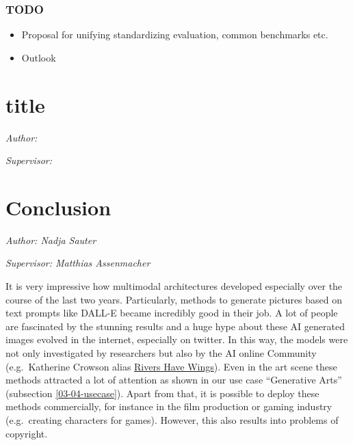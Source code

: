 \documentclass[
]{krantz}
\providecommand{\tightlist}{%
  \setlength{\itemsep}{0pt}\setlength{\parskip}{0pt}}
\begin{document}
\hypertarget{todo-4}{%
\subsection{TODO}\label{todo-4}}

\begin{itemize}
\tightlist
\item
  Proposal for unifying standardizing evaluation, common benchmarks etc.
\item
  Outlook
\end{itemize}

\hypertarget{title}{%
\chapter{title}\label{title}}

\emph{Author: }

\emph{Supervisor: }

\hypertarget{conclusion}{%
\chapter{Conclusion}\label{conclusion}}

\emph{Author: Nadja Sauter}

\emph{Supervisor: Matthias Assenmacher}

It is very impressive how multimodal architectures developed especially over the course of the last two years. Particularly, methods to generate pictures based on text prompts like DALL-E became incredibly good in their job. A lot of people are fascinated by the stunning results and a huge hype about these AI generated images evolved in the internet, especially on twitter. In this way, the models were not only investigated by researchers but also by the AI online Community (e.g.~Katherine Crowson alias \href{https://twitter.com/RiversHaveWings}{Rivers Have Wings}). Even in the art scene these methods attracted a lot of attention as shown in our use case ``Generative Arts'' (subsection \ref{03-04-usecase}). Apart from that, it is possible to deploy these methods commercially, for instance in the film production or gaming industry (e.g.~creating characters for games). However, this also results into problems of copyright.
\end{document}
